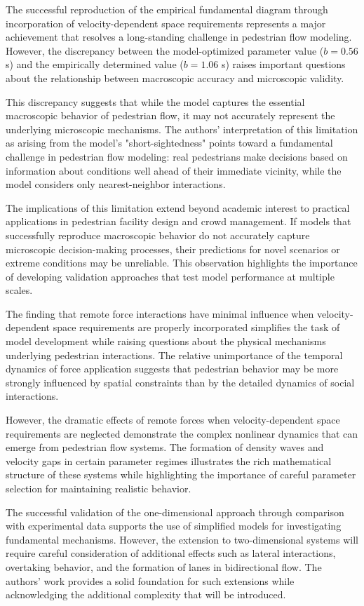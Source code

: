\documentclass[12pt,a4paper]{article}
\begin{document}
The successful reproduction of the empirical fundamental diagram through incorporation of velocity-dependent space requirements represents a major achievement that resolves a long-standing challenge in pedestrian flow modeling. However, the discrepancy between the model-optimized parameter value ($b = 0.56$ s) and the empirically determined value ($b = 1.06$ s) raises important questions about the relationship between macroscopic accuracy and microscopic validity.

This discrepancy suggests that while the model captures the essential macroscopic behavior of pedestrian flow, it may not accurately represent the underlying microscopic mechanisms. The authors' interpretation of this limitation as arising from the model's "short-sightedness" points toward a fundamental challenge in pedestrian flow modeling: real pedestrians make decisions based on information about conditions well ahead of their immediate vicinity, while the model considers only nearest-neighbor interactions.

The implications of this limitation extend beyond academic interest to practical applications in pedestrian facility design and crowd management. If models that successfully reproduce macroscopic behavior do not accurately capture microscopic decision-making processes, their predictions for novel scenarios or extreme conditions may be unreliable. This observation highlights the importance of developing validation approaches that test model performance at multiple scales.

The finding that remote force interactions have minimal influence when velocity-dependent space requirements are properly incorporated simplifies the task of model development while raising questions about the physical mechanisms underlying pedestrian interactions. The relative unimportance of the temporal dynamics of force application suggests that pedestrian behavior may be more strongly influenced by spatial constraints than by the detailed dynamics of social interactions.

However, the dramatic effects of remote forces when velocity-dependent space requirements are neglected demonstrate the complex nonlinear dynamics that can emerge from pedestrian flow systems. The formation of density waves and velocity gaps in certain parameter regimes illustrates the rich mathematical structure of these systems while highlighting the importance of careful parameter selection for maintaining realistic behavior.

The successful validation of the one-dimensional approach through comparison with experimental data supports the use of simplified models for investigating fundamental mechanisms. However, the extension to two-dimensional systems will require careful consideration of additional effects such as lateral interactions, overtaking behavior, and the formation of lanes in bidirectional flow. The authors' work provides a solid foundation for such extensions while acknowledging the additional complexity that will be introduced.
\end{document}
